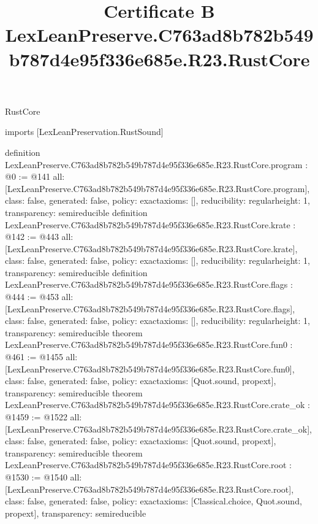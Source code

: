 \begin{lexlean}{RustCore}
\title{Certificate B LexLeanPreserve.C763ad8b782b549b787d4e95f336e685e.R23.RustCore}
\begin{coremodule}
imports [LexLeanPreservation.RustSound]

definition LexLeanPreserve.C763ad8b782b549b787d4e95f336e685e.R23.RustCore.program : @0 := @141 {
  all: [LexLeanPreserve.C763ad8b782b549b787d4e95f336e685e.R23.RustCore.program],
  class: false,
  generated: false,
  policy: exact{axioms: []},
  reducibility: regular{height: 1},
  transparency: semireducible
}
definition LexLeanPreserve.C763ad8b782b549b787d4e95f336e685e.R23.RustCore.krate : @142 := @443 {
  all: [LexLeanPreserve.C763ad8b782b549b787d4e95f336e685e.R23.RustCore.krate],
  class: false,
  generated: false,
  policy: exact{axioms: []},
  reducibility: regular{height: 1},
  transparency: semireducible
}
definition LexLeanPreserve.C763ad8b782b549b787d4e95f336e685e.R23.RustCore.flags : @444 := @453 {
  all: [LexLeanPreserve.C763ad8b782b549b787d4e95f336e685e.R23.RustCore.flags],
  class: false,
  generated: false,
  policy: exact{axioms: []},
  reducibility: regular{height: 1},
  transparency: semireducible
}
theorem LexLeanPreserve.C763ad8b782b549b787d4e95f336e685e.R23.RustCore.fun0 : @461 := @1455 {
  all: [LexLeanPreserve.C763ad8b782b549b787d4e95f336e685e.R23.RustCore.fun0],
  class: false,
  generated: false,
  policy: exact{axioms: [Quot.sound, propext]},
  transparency: semireducible
}
theorem LexLeanPreserve.C763ad8b782b549b787d4e95f336e685e.R23.RustCore.crate_ok : @1459 := @1522 {
  all: [LexLeanPreserve.C763ad8b782b549b787d4e95f336e685e.R23.RustCore.crate_ok],
  class: false,
  generated: false,
  policy: exact{axioms: [Quot.sound, propext]},
  transparency: semireducible
}
theorem LexLeanPreserve.C763ad8b782b549b787d4e95f336e685e.R23.RustCore.root : @1530 := @1540 {
  all: [LexLeanPreserve.C763ad8b782b549b787d4e95f336e685e.R23.RustCore.root],
  class: false,
  generated: false,
  policy: exact{axioms: [Classical.choice, Quot.sound, propext]},
  transparency: semireducible
}


\end{coremodule}
\end{lexlean}
